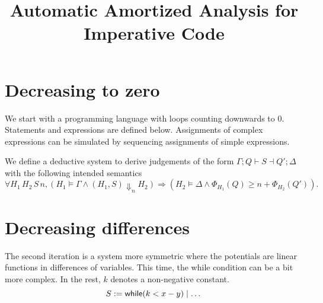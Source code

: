 \documentclass[10pt]{article}
\title{Automatic Amortized Analysis for Imperative Code}
\date{}
\author{}
\theoremstyle{newstyle}
\begin{document}
\maketitle

\section{Decreasing to zero}

We start with a programming language with loops counting
downwards to 0.  Statements and expressions are defined
below.  Assignments of complex expressions can be simulated
by sequencing assignments of simple expressions.
%
%
We define a deductive system to derive judgements of the
form $\Gamma; Q \vdash S \dashv Q'; \Delta$ with the following
intended semantics
$$
\forall H_1\, H_2\, S\, n,
    ( H_1 \models \Gamma \land
      (H_1, S) \Downarrow_n H_2
    ) \Rightarrow
    ( H_2 \models \Delta \land
      \Phi_{H_1}(Q) \ge n + \Phi_{H_2}(Q')
    ).
$$


\section{Decreasing differences}
The second iteration is a system more symmetric where the potentials
are linear functions in differences of variables.  This time, the while
condition can be a bit more complex.  In the rest, $k$
denotes a non-negative constant.
$$
S := \mathsf{while}(k < x - y) \mid \dots
$$
\end{document}
